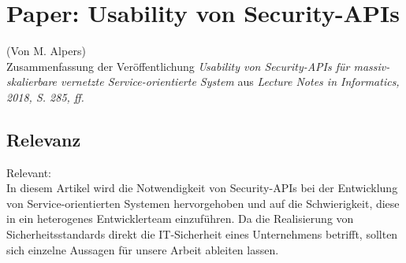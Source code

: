 \chapter{Paper: Usability von Security-APIs}
(Von M. Alpers)\\

Zusammenfassung der Veröffentlichung \emph{Usability von Security-APIs für massiv-skalierbare vernetzte Service-orientierte System} aus \emph{Lecture Notes in Informatics, 2018, S. 285, ff.}\\

\section{Relevanz}

Relevant:\\

In diesem Artikel wird die Notwendigkeit von Security-APIs bei der Entwicklung von Service-orientierten Systemen hervorgehoben und auf die Schwierigkeit, diese in ein heterogenes Entwicklerteam einzuführen. Da die Realisierung von Sicherheitsstandards direkt die IT-Sicherheit eines Unternehmens betrifft, sollten sich einzelne Aussagen für unsere Arbeit ableiten lassen.